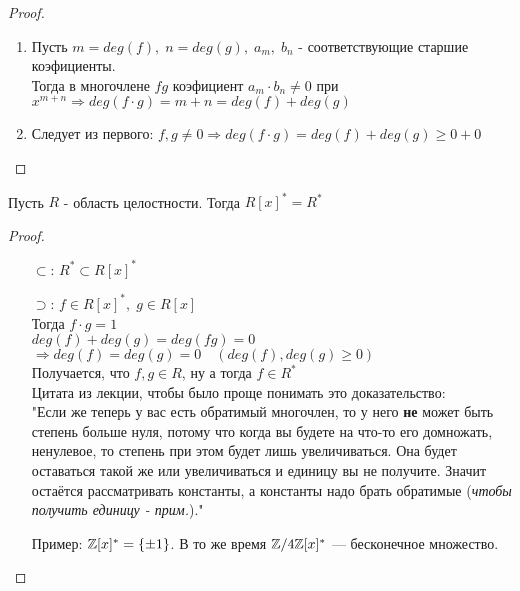 \begin{proof}
    $ $
    \begin{enumerate}
        \item Пусть $m = deg(f),\; n = deg(g),\; a_m,\; b_n$ - соответствующие старшие коэфициенты. \\
        Тогда в многочлене $fg$ коэфициент $a_m\cdot b_n \neq 0$ при $x^{m+n} \Rightarrow deg(f\cdot g) = m + n = deg(f) + deg(g)$    
        \item Следует из первого: $f,g \neq 0 \Rightarrow deg(f\cdot g) = deg(f) + deg(g) \geqslant 0 + 0$
    \end{enumerate}
\end{proof}
\follow \; Пусть $R$ - область целостности. Тогда $R[x]^* = R^*$
\begin{proof}
    $ $
    \begin{itemize}
        \item[$\subset$:] $R^* \subset R[x]^*$
        \item[$\supset$:] $f \in R[x]^*,\; g \in R[x]$ \\
        Тогда $f\cdot g = 1$ \\
        $deg(f) + deg(g) = deg(fg) = 0$ $\Rightarrow deg(f) = deg(g) = 0 \quad (deg(f), deg(g) \geqslant 0)$ \\
        Получается, что $f,g \in R$, ну а тогда $f \in R^*$ \\

        Цитата из лекции, чтобы было проще понимать это доказательство: \\
        "Если же теперь у вас есть обратимый многочлен, то у него \textbf{не} может быть степень больше нуля,
        потому что когда вы будете на что-то его домножать, ненулевое, то степень при этом будет лишь
        увеличиваться. Она будет оставаться такой же или увеличиваться и единицу вы не получите.
        Значит остаётся рассматривать константы, а константы надо брать обратимые
        (\emph{чтобы получить единицу - прим.})." 
        \item[Пример:] $\mathbb{Z}[x]^* = \{ \pm 1 \}$. В то же время $\mathbb{Z} / 4\mathbb{Z} [x]^*$ --- бесконечное множество.
    \end{itemize} 
\end{proof}

